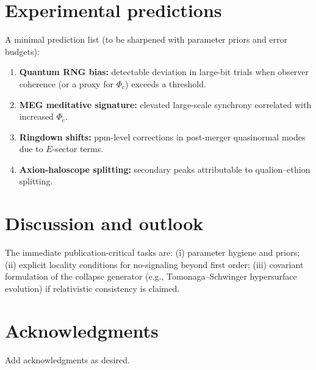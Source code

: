 \documentclass[11pt]{article}
\newcommand{\Phic}{\Phi_{\mathrm{c}}}
\newcommand{\Eth}{E}
\begin{document}
\section{Experimental predictions}
A minimal prediction list (to be sharpened with parameter priors and error budgets):
\begin{enumerate}[leftmargin=*,label=\arabic*.]
\item \textbf{Quantum RNG bias:} detectable deviation in large-bit trials when observer coherence
(or a proxy for $\Phic$) exceeds a threshold.
\item \textbf{MEG meditative signature:} elevated large-scale synchrony correlated with increased $\Phic$.
\item \textbf{Ringdown shifts:} ppm-level corrections in post-merger quasinormal modes due to $\Eth$-sector terms.
\item \textbf{Axion-haloscope splitting:} secondary peaks attributable to qualion--ethion splitting.
\end{enumerate}

\section{Discussion and outlook}
The immediate publication-critical tasks are: (i) parameter hygiene and priors; (ii) explicit locality
conditions for no-signaling beyond first order; (iii) covariant formulation of the collapse generator
(e.g., Tomonaga--Schwinger hypersurface evolution) if relativistic consistency is claimed.

\section*{Acknowledgments}
Add acknowledgments as desired.



\end{document}
